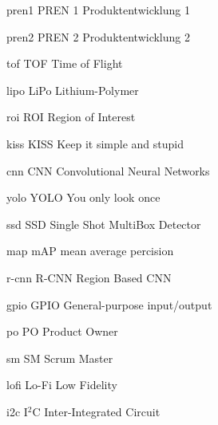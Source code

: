 \newacronym
  {pren1}                %
  {PREN 1}                %
  {Produktentwicklung 1}  %
  
\newacronym
  {pren2}                %
  {PREN 2}                %
  {Produktentwicklung 2}  %

\newacronym
  {tof}
  {TOF}
  {Time of Flight}
  
\newacronym
  {lipo}
  {LiPo}
  {Lithium-Polymer}

\newacronym
  {roi}
  {ROI}
  {Region of Interest}

\newacronym
 {kiss}
 {KISS}
 {Keep it simple and stupid}
 
\newacronym
 {cnn}
 {CNN}
 {Convolutional Neural Networks}
 
\newacronym
 {yolo}
 {YOLO}
 {You only look once}
 
 \newacronym
 {ssd}
 {SSD}
 {Single Shot MultiBox Detector}
 
\newacronym
 {map}
 {mAP}
 {mean average percision}

 \newacronym
 {r-cnn}
 {R-CNN}
 {Region Based CNN}

\newacronym
 {gpio}
 {GPIO}
 {General-purpose input/output}

\newacronym
  {po}
  {PO}
  {Product Owner}
  
\newacronym
  {sm}
  {SM}
  {Scrum Master}

\newacronym
  {lofi}
  {Lo-Fi}
  {Low Fidelity}
  
 \newacronym
  {i2c}
  {I$^2$C}
  {Inter-Integrated Circuit}